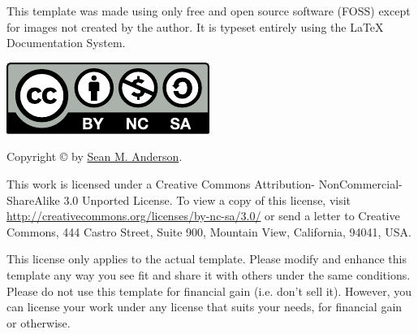 \null
\vfill
\begin{flushleft}
This template was made using only free and open source software (FOSS) except for images not created by the author. It is typeset entirely using the \LaTeX{} Documentation System.
\vspace{0.7cm}

{\href{http://creativecommons.org/licenses/by-nc-sa/3.0/}{\includegraphics[scale=0.6]{figures/by-nc-sa}}}

Copyright {\sffamily\copyright{}} \the\year{} by \href{mailto:sean.martin.anderson@gmail.com}{Sean M. Anderson}.

This work is licensed under a Creative Commons Attribution- NonCommercial-ShareAlike 3.0 Unported License. To view a copy of this license, visit \url{http://creativecommons.org/licenses/by-nc-sa/3.0/} or send a letter to Creative Commons, 444 Castro Street, Suite 900, Mountain View, California, 94041, USA.

This license only applies to the actual template. Please modify and enhance this template any way you see fit and share it with others under the same conditions. Please do not use this template for financial gain (i.e. don't sell it). However, you can license your work under any license that suits your needs, for financial gain or otherwise.
\end{flushleft}
\clearpage

